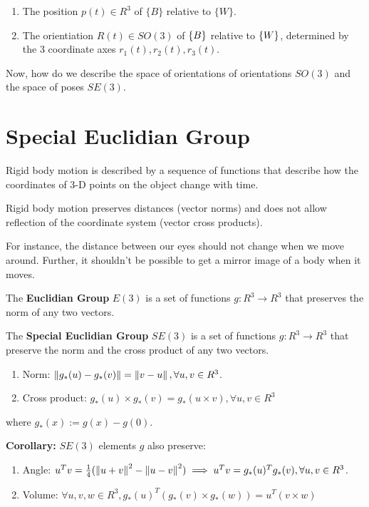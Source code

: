 \begin{enumerate}
    \item The position $p(t)\in R^3$ of $\{B\}$ relative to $\{W\}$.
    \item The orientiation $R(t) \in SO(3)$ of $\{B\}$ relative to $\{W\}$, determined by the 3 coordinate axes $r_1(t), r_2(t), r_3(t)$.
\end{enumerate}

Now, how do we describe the space of orientations of orientations $SO(3)$ and the space of poses $SE(3)$.

\section{Special Euclidian Group}

Rigid body motion is described by a sequence of functions that describe how the coordinates of 3-D points on the object change with time.

Rigid body motion preserves distances (vector norms) and does not allow reflection of the coordinate system (vector cross products).

For instance, the distance between our eyes should not change when we move around. Further, it shouldn't be possible to get a mirror image of a body when it moves.

The \textbf{Euclidian Group} $E(3)$ is a set of functions $g: R^3\to R^3$ that preserves the norm of any two vectors.

The \textbf{Special Euclidian Group} $SE(3)$ is a set of functions $g: R^3\to R^3$ that preserve the norm and the cross product of any two vectors.

\begin{enumerate}
    \item Norm: $\left\lVert g_*(u) - g_*(v)\right\rVert = \left\lVert v-u\right\rVert, \forall u, v \in R^3$.
    \item Cross product: $g_*(u) \times g_*(v) = g_*(u\times v), \forall u, v \in R^3$
\end{enumerate}

where $g_*(x) := g(x) - g(0)$.

\textbf{Corollary:} $SE(3)$ elements $g$ also preserve:

\begin{enumerate}
    \item Angle: $u^Tv = \frac{1}{4} (\left\lVert u + v\right\rVert^2 - \left\lVert u-v\right\rVert^2) \implies u^Tv = g_*(u)^T g_*(v), \forall u, v \in R^3$.
    \item Volume: $\forall u, v, w \in R^3, g_*(u)^T(g_*(v)\times g_*(w))=u^T(v\times w)$
\end{enumerate}

